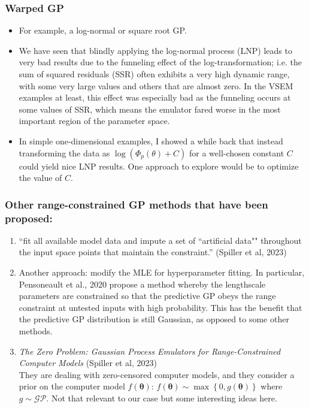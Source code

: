 \documentclass[12pt]{article}
\newcommand{\btheta}{\boldsymbol{\theta}}
\begin{document}
\subsubsection{Warped GP}
\begin{itemize}
\item For example, a log-normal or square root GP. 
\item We have seen that blindly applying the log-normal process (LNP) leads to very bad results due to the funneling effect of the log-transformation; i.e. the sum of squared residuals (SSR) often exhibits a very high dynamic range, 
with some very large values and others that are almost zero. In the VSEM examples at least, this effect was especially bad as the funneling occurs at some values of SSR, which means the emulator fared worse in the 
most important region of the parameter space. 
\item In simple one-dimensional examples, I showed a while back that instead transforming the data as $\log\left(\Phi_p(\theta) + C \right)$ for a well-chosen constant $C$ could yield nice LNP results. One approach to explore 
would be to optimize the value of $C$. 
\end{itemize}

\subsubsection{Other range-constrained GP methods that have been proposed:}
\begin{enumerate}
\item ``fit all available model data and impute a set of ``artificial data"" throughout the input space points that maintain the constraint.'' (Spiller et al, 2023)
\item Another approach: modify the MLE for hyperparameter fitting. In particular, Pensoneault et al., 2020 propose a method whereby the lengthscale parameters are constrained so that the predictive GP obeys the 
range constraint at untested inputs with high probability. This has the benefit that the predictive GP distribution is still Gaussian, as opposed to some other methods. 
\item \textit{The Zero Problem: Gaussian Process Emulators for Range-Constrained Computer Models} (Spiller et al, 2023) \\
They are dealing with zero-censored computer models, and they consider a prior on the computer model $f(\btheta)$: $f(\btheta) \sim \max \left\{0, g(\btheta) \right\}$ where $g \sim \mathcal{GP}$. Not that relevant to our 
case but some interesting ideas here.  
\end{enumerate}
\end{document}
